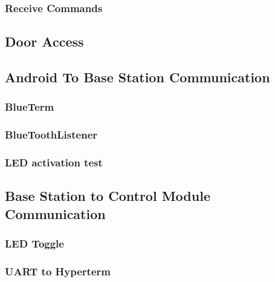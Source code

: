\subsubsection{Receive Commands}

\subsection{Door Access}
\tbw

\subsection{Android To Base Station Communication}

\subsubsection{BlueTerm}

\subsubsection{BlueToothListener}

\subsubsection{LED activation test}

\subsection{Base Station to Control Module Communication}

\subsubsection{LED Toggle}

\subsubsection{UART to Hyperterm}

